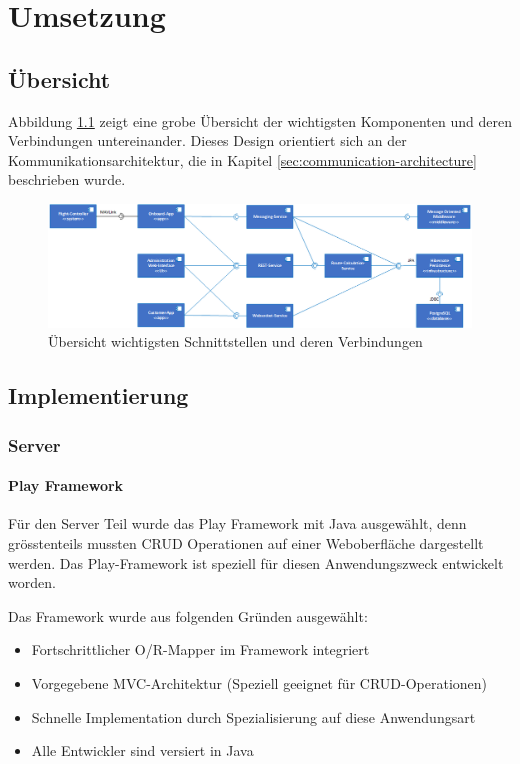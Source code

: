 \newpage
\chapter{Umsetzung}

\section{Übersicht}

Abbildung \ref{fig:component-overview} zeigt eine grobe Übersicht der wichtigsten Komponenten und deren Verbindungen untereinander. Dieses Design orientiert sich an der Kommunikationsarchitektur, die in Kapitel \ref{sec:communication-architecture} beschrieben wurde.

\begin{figure}[H]
	\includegraphics[width=1.0\textwidth]{images/component-overview.png}
	\caption{Übersicht wichtigsten Schnittstellen und deren Verbindungen }
	\label{fig:component-overview}
\end{figure}
\section{Implementierung}

\subsection{Server}

\subsubsection{Play Framework}
Für den Server Teil wurde das Play Framework mit Java ausgewählt, denn grösstenteils mussten CRUD Operationen auf einer Weboberfläche dargestellt werden. Das Play-Framework ist speziell für diesen Anwendungszweck entwickelt worden.

Das Framework wurde aus folgenden Gründen ausgewählt:
\begin{itemize}
    \item Fortschrittlicher O/R-Mapper im Framework integriert
    \item Vorgegebene MVC-Architektur (Speziell geeignet für CRUD-Operationen)
    \item Schnelle Implementation durch Spezialisierung auf diese Anwendungsart 
    \item Alle Entwickler sind versiert in Java
\end{itemize}

